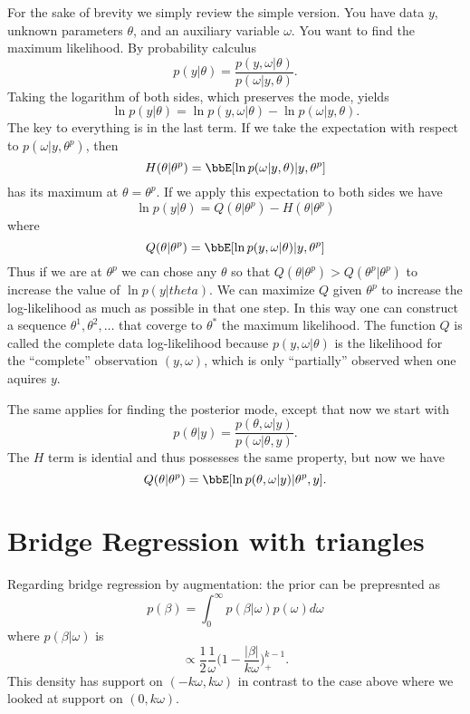\documentclass{article}
\begin{document}
For the sake of brevity we simply review the simple version.  You have data $y$,
unknown parameters $\theta$, and an auxiliary variable $\omega$.  You want to
find the maximum likelihood.  By probability calculus
\begin{displaymath}
\label{eqn:marginal}
p(y|\theta) = \frac{p(y,\omega | \theta)}{p(\omega | y, \theta)}.
\end{displaymath}
Taking the logarithm of both sides, which preserves the mode, yields
\[
\ln p(y | \theta) = \ln p(y,\omega | \theta) - \ln p(\omega | y, \theta).
\]
The key to everything is in the last term.  If we take the expectation with
respect to $p(\omega | y, \theta^p)$, then
\[
H(\theta | \theta^p) = \bbE [ \ln p(\omega | y, \theta) | y, \theta^p ]
\]
has its maximum at $\theta = \theta^p$.  If we apply this expectation to both
sides we have
\[
\ln p(y | \theta) = Q(\theta | \theta^p) - H(\theta | \theta^p)
\]
where
\[
Q(\theta | \theta^p) = \bbE[ \ln p(y,\omega | \theta) | y, \theta^p ]
\]
Thus if we are at $\theta^p$ we can chose any $\theta$ so that $Q(\theta |
\theta^p) > Q(\theta^p | \theta^p)$ to increase the value of $\ln p(y | theta)$.
We can maximize $Q$ given $\theta^p$ to increase the log-likelihood as much as
possible in that one step.  In this way one can construct a sequence $\theta^1,
\theta^2, \ldots$ that coverge to $\theta^*$ the maximum likelihood.  The
function $Q$ is called the complete data log-likelihood because $p(y, \omega |
\theta)$ is the likelihood for the ``complete'' observation $(y, \omega)$, which
is only ``partially'' observed when one aquires $y$.

The same applies for finding the posterior mode, except that now we start with
\[
p(\theta | y) = \frac{p(\theta, \omega | y)}{p(\omega | \theta, y)}.
\]
The $H$ term is idential and thus possesses the same property, but now we have
\[
Q(\theta | \theta^p) = \bbE[ \ln p(\theta, \omega | y) | \theta^p, y ].
\]

\section{Bridge Regression with triangles}

Regarding bridge regression by augmentation: the prior can be prepresnted as
\[
p(\beta) = \int_0^\infty p(\beta | \omega) p(\omega) d \omega
\]
where $p(\beta | \omega)$ is 
\[
\propto \frac{1}{2} \frac{1}{\omega} \Big( 1 - \frac{|\beta|}{k\omega}
\Big)^{k-1}_+.
\]
This density has support on $(-k\omega, k \omega)$ in contrast to the case above
where we looked at support on $(0, k \omega)$.
\end{document}
